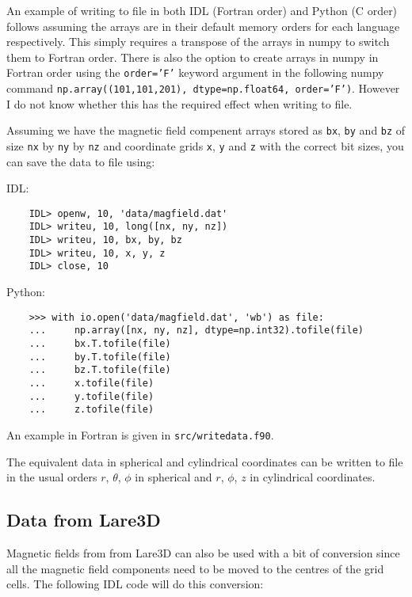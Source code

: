 \documentclass[12pt]{article}
\begin{document}
    An example of writing to file in both IDL (Fortran order) and Python (C order) follows assuming the arrays are in their default memory orders for each language respectively. This simply requires a transpose of the arrays in numpy to switch them to Fortran order. There is also the option to create arrays in numpy in Fortran order using the \texttt{order='F'} keyword argument in the following numpy command
    \texttt{np.array((101,101,201), dtype=np.float64, order='F')}. However I do not know whether this has the required effect when writing to file.
    
    Assuming we have the magnetic field compenent arrays stored as \texttt{bx}, \texttt{by} and \texttt{bz} of size \texttt{nx} by \texttt{ny} by \texttt{nz} and coordinate grids \texttt{x}, \texttt{y} and \texttt{z} with the correct bit sizes, you can save the data to file using:

    IDL:

    \begin{verbatim}
    IDL> openw, 10, 'data/magfield.dat'
    IDL> writeu, 10, long([nx, ny, nz])
    IDL> writeu, 10, bx, by, bz
    IDL> writeu, 10, x, y, z
    IDL> close, 10
    \end{verbatim}

    Python:

    \begin{verbatim}
    >>> with io.open('data/magfield.dat', 'wb') as file:
    ...     np.array([nx, ny, nz], dtype=np.int32).tofile(file)
    ...     bx.T.tofile(file)
    ...     by.T.tofile(file)
    ...     bz.T.tofile(file)
    ...     x.tofile(file)
    ...     y.tofile(file)
    ...     z.tofile(file)
    \end{verbatim}

    An example in Fortran is given in \texttt{src/writedata.f90}.

    The equivalent data in spherical and cylindrical coordinates can be written to file in the usual orders \( r \), \( \theta \), \( \phi \) in spherical and \( r \), \( \phi \), \( z \) in cylindrical coordinates.

    \subsection{Data from Lare3D}

      Magnetic fields from from Lare3D can also be used with a bit of conversion since all the magnetic field components need to be moved to the centres of the grid cells. The following IDL code will do this conversion:
\end{document}
